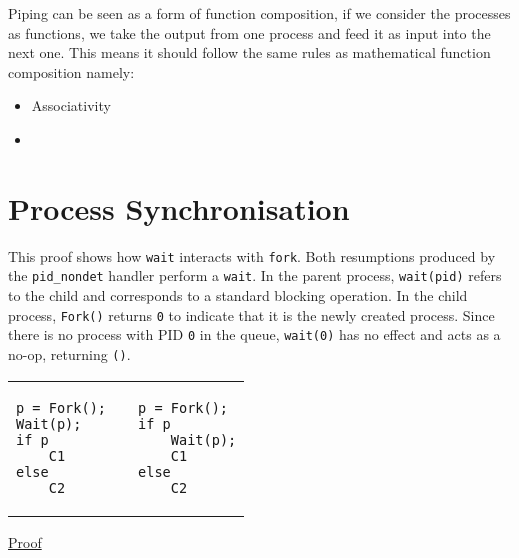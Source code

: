 \documentclass[logo,bsc,singlespacing,parskip]{infthesis}
\begin{document}
Piping can be seen as a form of function composition, if we consider the processes as functions, we take the output from one process and feed it as input into the next one. This means it should follow the same rules as mathematical function composition namely:
\begin{itemize}
    \item Associativity
    \item 
\end{itemize}


\section*{Process Synchronisation}



This proof shows how \texttt{wait} interacts with \texttt{fork}. Both resumptions produced by the \texttt{pid\_nondet} handler perform a \texttt{wait}. In the parent process, \texttt{wait(pid)} refers to the child and corresponds to a standard blocking operation. In the child process, \texttt{Fork()} returns \texttt{0} to indicate that it is the newly created process. Since there is no process with PID \texttt{0} in the queue, \texttt{wait(0)} has no effect and acts as a no-op, returning \texttt{()}.

\vspace{-2em}
\begin{table}[H]
\centering
\begin{tabular}{p{} c p{}}
\begin{lstlisting}
p = Fork();
Wait(p);
if p
    C1
else
    C2
\end{lstlisting}
&
&
\begin{lstlisting}
p = Fork();
if p
    Wait(p);
    C1
else
    C2
\end{lstlisting}
\end{tabular}
\end{table}
\vspace{-2em}

\underline{Proof}
\end{document}
